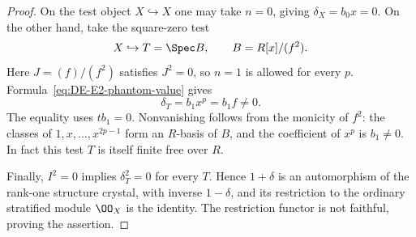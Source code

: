 \begin{proof}
On the test object $X\hookrightarrow X$ one may take $n=0$, giving
$\delta_X=b_0x=0$.  On the other hand, take the square-zero test
\[
             X\hookrightarrow T=\Spec B,\qquad B=R[x]/(f^2).
\]
Here $J=(f)/(f^2)$ satisfies $J^2=0$, so $n=1$ is allowed for every $p$.  Formula~\eqref{eq:DE-E2-phantom-value} gives
\[
                  \delta_T=b_1x^p=b_1f\ne0.
\]
The equality uses $tb_1=0$.  Nonvanishing follows from the monicity of $f^2$: the classes of $1,x,\ldots,x^{2p-1}$ form an $R$-basis of $B$, and the coefficient of $x^p$ is $b_1\ne0$.  In fact this test $T$ is itself finite free over $R$.

Finally, $I^2=0$ implies $\delta_T^2=0$ for every $T$.  Hence $1+\delta$ is an automorphism of the rank-one structure crystal, with inverse $1-\delta$, and its restriction to the ordinary stratified module $\OO_X$ is the identity.  The restriction functor is not faithful, proving the assertion.
\end{proof}


